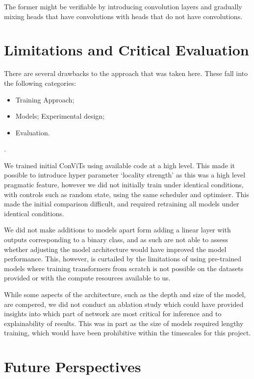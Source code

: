 The former might be verifiable by introducing convolution layers and gradually mixing heads that have convolutions with heads that do not have convolutions. 




\section{Limitations and Critical Evaluation}

\label{sec:limitations}
There are several drawbacks to the approach that was taken here. These fall into the following categories: \begin{itemize}
    \item Training Approach;
    \item Models;
    \itme Experimental design;
    \item Evaluation.
\end{itemize}.

We trained initial ConViTs\cite{DAscoli2021} using available code at a high level. This made it possible to introduce hyper parameter `locality strength' as this was a high level pragmatic feature, however we did not initially train under identical conditions, with controls such as random state, using the same scheduler and optimiser. This made the initial comparison difficult, and required retraining all models under identical conditions. 

We did not make additions to models apart form adding a linear layer with outputs corresponding to a binary class, and as such are not able to assess whether adjusting the model architecture would have improved the model performance. This, however, is curtailed by the limitations of using pre-trained models where training transformers from scratch is not possible on the datasets provided or with the compute resources available to us.

While some aspects of the architecture, such as the depth and size of the model, are compered, we did not conduct an ablation study which could have provided insights into which part of network are most critical for inference and to explainability of results. This was in part as the size of models required lengthy training, which would have been prohibitive within the timescales for this project. 

\section{Future Perspectives}

